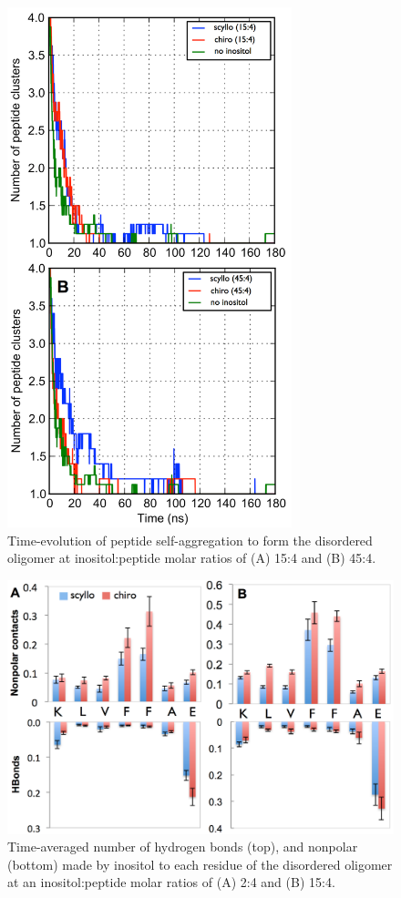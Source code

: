 \begin{figure}[ht]
\centering
\includegraphics[width=8.25cm]{figures/appendixA/inos2_figures_SI_disorderedCluster.pdf}
\caption[Time-evolution of peptide self-aggregation to form the disordered oligomer]{Time-evolution of peptide self-aggregation to form the disordered oligomer at inositol:peptide molar ratios of (A) 15:4 and (B) 45:4.}
\label{fig:SI-disorderedCluster}
\end{figure}

\begin{figure}[ht]
\centering
\includegraphics[width=14cm]{figures/appendixA/inos2_figures_SI_disorderedBinding_revised.pdf}
\caption[Time-averaged number of hydrogen bonds and nonpolar made by inositol to each residue of the disordered oligomer]{Time-averaged number of hydrogen bonds (top), and nonpolar (bottom) made by inositol to each residue of the disordered oligomer at an inositol:peptide molar ratios of (A) 2:4 and (B) 15:4.}
\label{fig:SI-disorderedBinding}
\end{figure}

